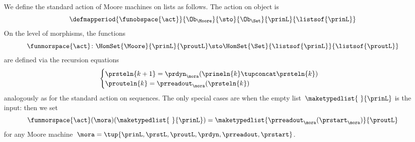 \begin{definition}
    \label{def:moore-standard-action-on-lists}
    We define the standard action of Moore machines on lists as follows.
    The action on object is
    \begin{equation}
        \defmapperiod{\funobspace{\act}}
        {\Ob_{\Moore}}
        {\sto}
        {\Ob_{\Set}}
        {\prinL}
        {\listsof{\prinL}}
    \end{equation}
    On the level of morphisms, the functions
    \begin{equation}
        \funmorspace{\act} \colon  \HomSet{\Moore}{\prinL}{\proutL} \sto \HomSet{\Set}{ \listsof{\prinL}}{\listsof{\proutL}}
    \end{equation}
    are defined via the recursion equations
    \begin{equation}
        \begin{cases}
            \prsteln{k+1} = \prdyn_\mora(\prineln{k} \tupconcat \prsteln{k}) \\
            \prouteln{k}   = \prreadout_\mora(\prsteln{k})
        \end{cases}
    \end{equation}
    analogously as for the standard action on sequences.
    The only special cases are when the empty list~$\maketypedlist{\ }{\prinL}$ is the input: then we set
    \begin{equation}
        \funmorspace{\act}(\mora)(\maketypedlist{\ }{\prinL}) = \maketypedlist{ \prreadout_\mora(\prstart_\mora) }{\proutL}
    \end{equation}
    for any Moore machine~$\mora = \tup{\prinL,\prstL,\proutL,\prdyn,\prreadout,\prstart}$.
\end{definition}

